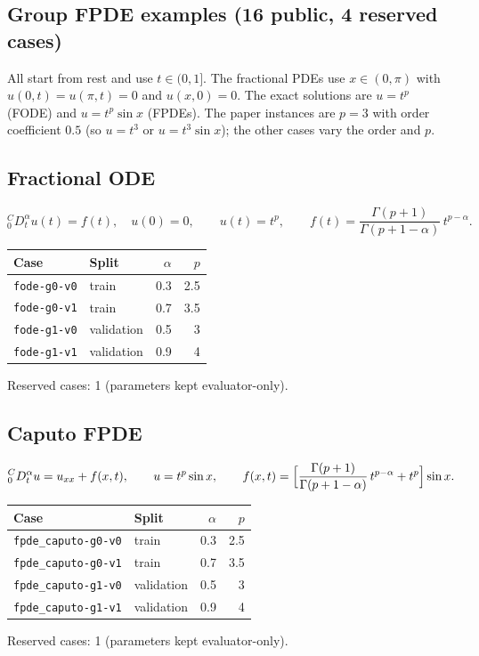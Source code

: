 \documentclass[11pt]{article}
\newcommand{\Caputo}[1]{{}^{C}_{0}D_t^{#1}}
\begin{document}
\subsection{Group FPDE examples (16 public, 4 reserved cases)}
All start from rest and use $t\in(0,1]$. The fractional PDEs use $x\in(0,\pi)$ with $u(0,t)=u(\pi,t)=0$ and
$u(x,0)=0$. The exact solutions are $u=t^{p}$ (FODE) and $u=t^{p}\sin x$ (FPDEs). The paper instances are
$p=3$ with order coefficient $0.5$ (so $u=t^3$ or $u=t^3\sin x$); the other cases vary the order and $p$.

\subsection{Fractional ODE}
\begin{equation*}
\Caputo{\alpha}u(t) = f(t),\quad u(0)=0,\qquad u(t)=t^{p},\qquad
f(t)=\frac{\Gamma(p+1)}{\Gamma(p+1-\alpha)}\,t^{p-\alpha}.
\end{equation*}

\begin{center}\small
\begin{tabular}{llrr}
\toprule
Case & Split & $\alpha$ & $p$ \\
\midrule
\texttt{fode-g0-v0} & train & 0.3 & 2.5 \\
\texttt{fode-g0-v1} & train & 0.7 & 3.5 \\
\texttt{fode-g1-v0} & validation & 0.5 & 3 \\
\texttt{fode-g1-v1} & validation & 0.9 & 4 \\
\bottomrule
\end{tabular}
\end{center}
\noindent Reserved cases: 1 (parameters kept evaluator-only).

\subsection{Caputo FPDE}
\begin{equation*}
\Caputo{\alpha}u = u_{xx} + f(x,t),\qquad u=t^{p}\sin x,\qquad
f(x,t)=\Bigl[\frac{\Gamma(p+1)}{\Gamma(p+1-\alpha)}\,t^{p-\alpha} + t^{p}\Bigr]\sin x.
\end{equation*}

\begin{center}\small
\begin{tabular}{llrr}
\toprule
Case & Split & $\alpha$ & $p$ \\
\midrule
\texttt{fpde\_caputo-g0-v0} & train & 0.3 & 2.5 \\
\texttt{fpde\_caputo-g0-v1} & train & 0.7 & 3.5 \\
\texttt{fpde\_caputo-g1-v0} & validation & 0.5 & 3 \\
\texttt{fpde\_caputo-g1-v1} & validation & 0.9 & 4 \\
\bottomrule
\end{tabular}
\end{center}
\noindent Reserved cases: 1 (parameters kept evaluator-only).
\end{document}
